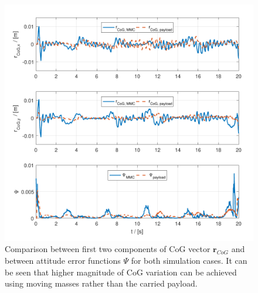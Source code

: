 \begin{figure}[h!]
	\centering
	\includegraphics[width=\columnwidth]{./pictures/traj_cog.pdf}
	\caption{Comparison between first two components of CoG vector $\textbf{r}_{CoG}$ and between attitude error functions $\Psi$ for both simulation cases. It can be seen that higher magnitude of CoG variation can be achieved using moving masses rather than the carried payload.}
	\label{fig:cog_error}
\end{figure}

